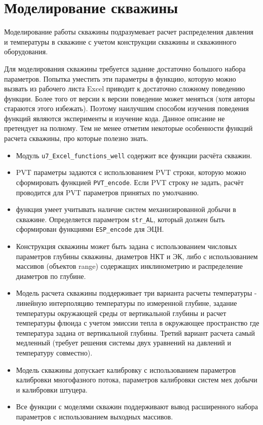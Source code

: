 \section{Моделирование скважины}
Моделирование работы скважины подразумевает расчет распределения давления и температуры в скважине с учетом конструкции скважины и скважинного оборудования. 

Для моделирования скважины требуется задание достаточно большого набора параметров. Попытка уместить эти параметры в функцию, которую можно вызвать из рабочего листа Excel приводит к достаточно сложному поведению функции. Более того от версии к версии поведение может меняться (хотя авторы стараются этого избежать). Поэтому наилучшим способом изучения поведения функций являются эксперименты и изучение кода. Данное описание не претендует на полному. Тем не менее отметим некоторые особенности функций расчета скважины, про которые полезно знать.

\begin{itemize}
	\item Модуль  \texttt{u7_Excel_functions_well} содержит все функции расчёта скважин.
	\item PVT параметры задаются с использованием PVT строки, которую можно сформировать функцией \texttt{PVT_encode}. Если PVT строку не задать, расчёт проводится для PVT параметров принятых по умолчанию. 
	\item функция умеет учитывать наличие систем механизированной добычи в скважине. Определяется параметром  \texttt{str_AL}, который должен быть сформирован функциями \texttt{ESP_encode} для ЭЦН. %
	\item  Конструкция скважины может быть задана с использованием числовых параметров глубины скважины, диаметров НКТ и ЭК, либо с использованием массивов (объектов range) содержащих инклинометрию и распределение диаметров по глубине. 
	\item  Модель расчета скважины поддерживает три варианта расчеты температуры - линейную интерполяцию температуры по измеренной глубине, задание температуры окружающей среды от вертикальной глубины и расчет температуры флюида с учетом эмиссии тепла в окружающее пространство где температура задана от вертикальной глубины. Третий вариант расчета самый медленный (требует решения системы двух уравнений на давлений и температуру совместно).
	\item  Модель скважины допускает калибровку с использованием параметров калибровки многофазного потока, параметров калибровки систем мех добычи и калибровки штуцера.
	\item  Все функции с моделями скважин поддерживают вывод расширенного набора параметров с использованием выходных массивов.
\end{itemize}

